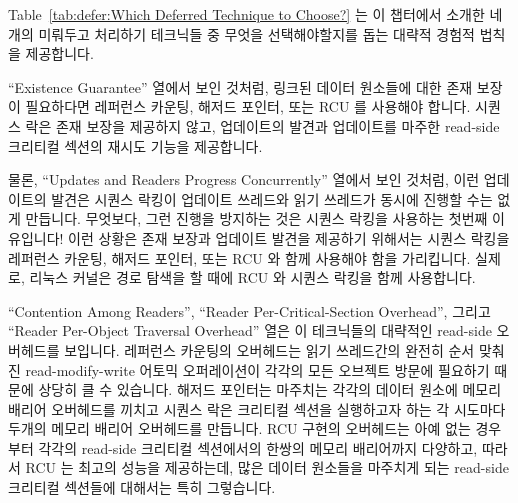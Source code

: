 Table~\ref{tab:defer:Which Deferred Technique to Choose?}
는 이 챕터에서 소개한 네개의 미뤄두고 처리하기 테크닉들 중 무엇을
선택해야할지를 돕는 대략적 경험적 법칙을 제공합니다.

``Existence Guarantee'' 열에서 보인 것처럼, 링크된 데이터 원소들에 대한 존재
보장이 필요하다면 레퍼런스 카운팅, 해저드 포인터, 또는 RCU 를 사용해야 합니다.
시퀀스 락은 존재 보장을 제공하지 않고, 업데이트의 발견과 업데이트를 마주한
read-side 크리티컬 섹션의 재시도 기능을 제공합니다.
\iffalse

Table~\ref{tab:defer:Which Deferred Technique to Choose?}
provides some rough rules of thumb that can help you choose among the
four deferred-processing techniques presented in this chapter.

As shown in the ``Existence Guarantee'' row,
if you need existence guarantees for linked
data elements, you must use reference counting, hazard pointers, or RCU.
Sequence locks do not provide existence guarantees, instead providing
detection of updates, retrying any read-side critical sections
that do encounter an update.
\fi

물론, ``Updates and Readers Progress Concurrently'' 열에서 보인 것처럼, 이런
업데이트의 발견은 시퀀스 락킹이 업데이트 쓰레드와 읽기 쓰레드가 동시에 진행할
수는 없게 만듭니다.
무엇보다, 그런 진행을 방지하는 것은 시퀀스 락킹을 사용하는 첫번째 이유입니다!
이런 상황은 존재 보장과 업데이트 발견을 제공하기 위해서는 시퀀스 락킹을
레퍼런스 카운팅, 해저드 포인터, 또는 RCU 와 함께 사용해야 함을 가리킵니다.
실제로, 리눅스 커널은 경로 탐색을 할 때에 RCU 와 시퀀스 락킹을 함께 사용합니다.
\iffalse

Of course, as shown in the ``Updates and Readers Progress Concurrently''
row, this detection of updates implies
that sequence locking does not permit updaters and readers to make forward
progress concurrently.
After all, preventing such forward progress is the whole point of using
sequence locking in the first place!
This situation points the way to using sequence locking in conjunction
with reference counting, hazard pointers, or RCU in order to provide
both existence guarantees and update detection.
In fact, the Linux kernel combines RCU and sequence locking in
this manner during pathname lookup.
\fi

``Contention Among Readers'', ``Reader Per-Critical-Section Overhead'',
그리고 ``Reader Per-Object Traversal Overhead'' 열은 이 테크닉들의 대략적인
read-side 오버헤드를 보입니다.
레퍼런스 카운팅의 오버헤드는 읽기 쓰레드간의 완전히 순서 맞춰진
read-modify-write 어토믹 오퍼레이션이 각각의 모든 오브젝트 방문에 필요하기
때문에 상당히 클 수 있습니다.
해저드 포인터는 마주치는 각각의 데이터 원소에 메모리 배리어 오버헤드를 끼치고
시퀀스 락은 크리티컬 섹션을 실행하고자 하는 각 시도마다 두개의 메모리 배리어
오버헤드를 만듭니다.
RCU 구현의 오버헤드는 아예 없는 경우부터 각각의 read-side 크리티컬 섹션에서의
한쌍의 메모리 배리어까지 다양하고, 따라서 RCU 는 최고의 성능을 제공하는데, 많은
데이터 원소들을 마주치게 되는 read-side 크리티컬 섹션들에 대해서는 특히
그렇습니다.
\iffalse

